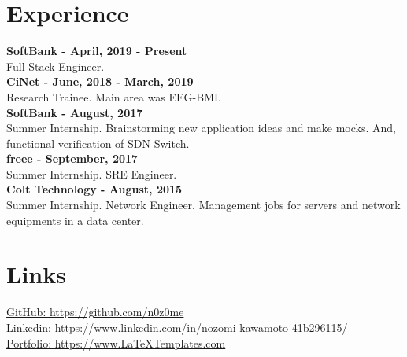 \documentclass[12pt]{article} %
\begin{document}
\begin{paracol}{2}
\vspace{1cm}

\section{Experience}
\textbf{\color{subtitle}SoftBank - April, 2019 - Present}\\
Full Stack Engineer.\\

\textbf{\color{subtitle}CiNet - June, 2018 - March, 2019}\\
Research Trainee. Main area was EEG-BMI.\\

\textbf{\color{subtitle}SoftBank - August, 2017}\\
Summer Internship. Brainstorming new application ideas and make mocks. And, functional verification of SDN Switch.\\

\textbf{\color{subtitle}freee - September, 2017}\\
Summer Internship. SRE Engineer.\\

\textbf{\color{subtitle}Colt Technology - August, 2015}\\
Summer Internship. Network Engineer. Management jobs for servers and network equipments in a data center.\\

\vspace{1cm}

\section{Links}
{\faGithub} \hspace{1mm} \href{https://github.com/n0z0me}{GitHub: https://github.com/n0z0me} \\ %
{\faLinkedinSquare} \hspace{1mm} \href{https://www.linkedin.com/in/nozomi-kawamoto-41b296115/}{Linkedin: https://www.linkedin.com/in/nozomi-kawamoto-41b296115/} \\ %
{\small\faDesktop} \hspace{1mm} \href{https://www.LaTeXTemplates.com}{Portfolio: https://www.LaTeXTemplates.com} \\ %

\end{paracol}

\end{document}
